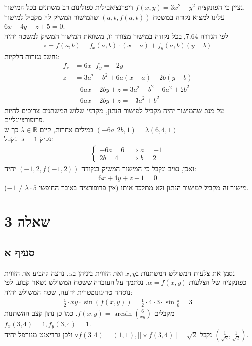 \documentclass{article}
\def\reals{\mathbb{R}}
\begin{document}
נציין כי הפונקציה $f(x,y)=3x^2-y^2$ דיפרנציאבילית כפולינום רב-משתנים בכל המישור.\\
עלינו למצוא נקודה במשטח $(a,b,f(a,b))$ שהמישור המשיק לה מקביל למישור $6x+4y+z+5=0$. \\
לפי הגדרה $7.64$, בכל נקודה במישור מצורה זו, משוואת המישור המשיק למשטח יהיה:
\begin{align*}
    z=f(a, b)+f_x(a,b)\cdot (x-a)+f_y(a, b)(y-b)
\end{align*}
נחשב נגזרות חלקיות:
\begin{align*}
    f_x & =6x \ \ \ f_y = -2y           \\
    z   & =3a^2-b^2+6a(x-a)-2b(y-b)     \\
        & -6ax+2by+z=3a^2-b^2-6a^2+2b^2 \\
        & -6ax+2by+z=-3a^2+b^2
\end{align*}
על מנת שהמישור יהיה מקביל למישור הנתון, מקדמי שלוש המשתנים צריכים להיות פרופורציונליים. \\
במילים אחרות, קיים $\lambda\in \reals$ כך ש $(-6a, 2b, 1)=\lambda(6,4,1)$ \\
נסיק $\lambda=1$ ונקבל:
\begin{align*}
    \begin{cases}
        -6a=6 & \Rightarrow a=-1 \\
        2b=4  & \Rightarrow b=2
    \end{cases}
\end{align*}
ואכן, נציב ונקבל כי המישור המשיק בנקודה $(-1,2, f(-1,2))$ יהיה:
\begin{align*}
    6x+4y+z-1=0
\end{align*}
מישור זה מקביל למישור הנתון ולא מתלכד איתו (אין פרופורציה באיבר החופשי $-1\ne \lambda\cdot 5$).

\pagebreak

\section*{שאלה 3}

\subsection*{סעיף א}

נסמן את צלעות המשולש המשתנות ב$x,y$ ואת הזווית ביניהן ב$\alpha$. נרצה להביע את הזווית כפונקציה של הצלעות $\alpha = f(x,y)$. נסתמך על העובדה ששטח המשולש נשאר קבוע. לפי נוסחה טריגונומטרית ידועה, שטח המשולש יהיה:
\begin{align*}
    \frac{1}{2} \cdot xy \cdot \sin(f(x,y))=\frac{1}{2} \cdot 4 \cdot 3 \cdot \sin \frac{\pi}{6} = 3
\end{align*}
מקבלים $f(x,y)=\arcsin(\frac{6}{xy})$. כמו כן נתון קצב ההשתנות $f_x(3,4)=1, f_y(3,4)=1$.\\
נקבל $\triangledown f(3,4)=(1,1), ||\triangledown f(3,4)||=\sqrt{2}$ ולכן גרדיאנט מנורמל יהיה $(\frac{1}{\sqrt{2}}, \frac{1}{\sqrt{2}})$.
\end{document}
